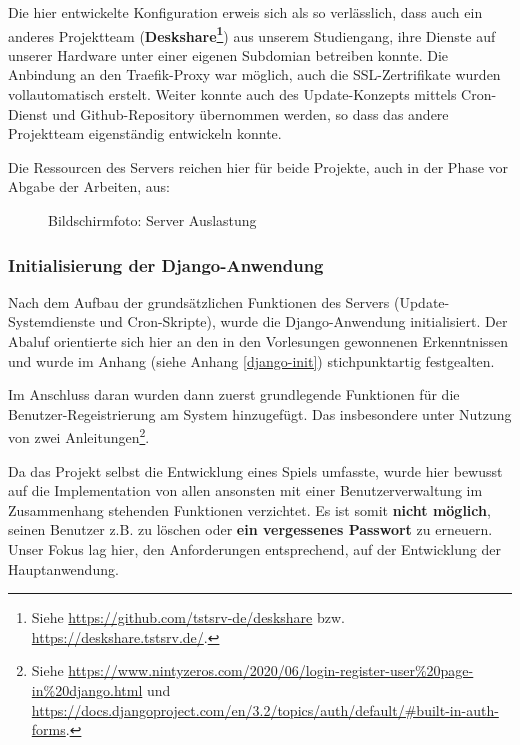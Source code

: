 Die hier entwickelte Konfiguration erweis sich als so verlässlich, dass auch ein anderes Projektteam (\textbf{Deskshare\footnote{Siehe \url{https://github.com/tstsrv-de/deskshare} bzw. \url{https://deskshare.tstsrv.de/}.}}) aus unserem Studiengang, ihre Dienste auf unserer Hardware unter einer eigenen Subdomian betreiben konnte. Die Anbindung an den Traefik-Proxy war möglich, auch die SSL-Zertrifikate wurden vollautomatisch erstelt. Weiter konnte auch des Update-Konzepts mittels Cron-Dienst und Github-Repository übernommen werden, so dass das andere Projektteam eigenständig entwickeln konnte. 


Die Ressourcen des Servers reichen hier für beide Projekte, auch in der Phase vor Abgabe der Arbeiten, aus: 

\begin{figure}[H]
    \centering
    \label{fig:henning-server-auslastung}
    \caption{Bildschirmfoto: Server Auslastung}
\end{figure}






\subsubsection{Initialisierung der Django-Anwendung}

Nach dem Aufbau der grundsätzlichen Funktionen des Servers (Update-Systemdienste und Cron-Skripte), wurde die Django-Anwendung initialisiert. Der Abaluf orientierte sich hier an den in den Vorlesungen gewonnenen Erkenntnissen und wurde im Anhang (siehe Anhang \ref{django-init}) stichpunktartig festgealten. 

Im Anschluss daran wurden dann zuerst grundlegende Funktionen für die Benutzer-Regeistrierung am System hinzugefügt. Das  insbesondere unter Nutzung von zwei Anleitungen\footnote{Siehe  \url{https://www.nintyzeros.com/2020/06/login-register-user\%20page-in\%20django.html} und \url{https://docs.djangoproject.com/en/3.2/topics/auth/default/\#built-in-auth-forms}.}.


Da das Projekt selbst die Entwicklung eines Spiels umfasste, wurde hier bewusst auf die Implementation von allen ansonsten mit einer Benutzerverwaltung im Zusammenhang stehenden Funktionen verzichtet. Es ist somit \textbf{nicht möglich}, seinen Benutzer z.B. zu löschen oder \textbf{ein vergessenes Passwort} zu erneuern. Unser Fokus lag hier, den Anforderungen entsprechend, auf der Entwicklung der Hauptanwendung. 

